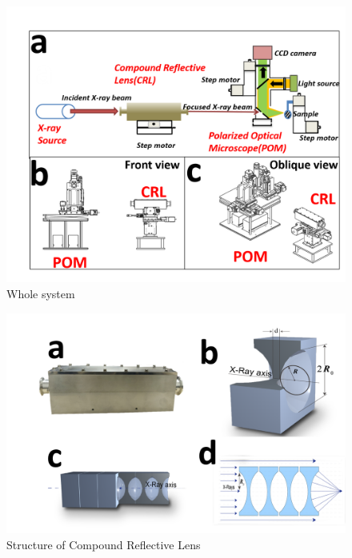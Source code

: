 \begin{figure}
    \centering
    \includegraphics[scale=0.5]{Figures/Fig1WholeSystem.png}
    \caption{Whole system}
    \label{WholeSystem}
\end{figure}


\begin{figure}
    \centering
    \includegraphics[scale=0.5]{Figures/Fig2CRL.png}
    \caption{Structure of Compound Reflective Lens}
    \label{CRL}
\end{figure}


